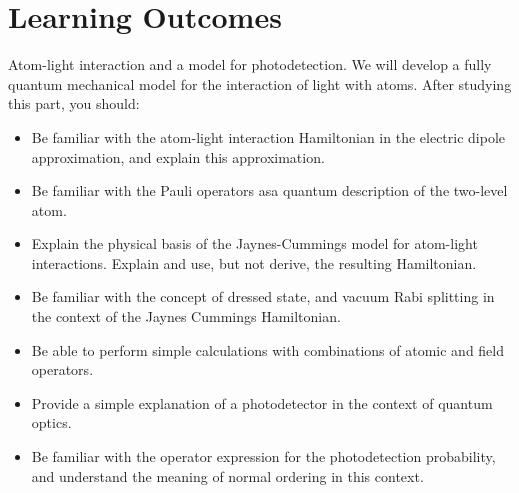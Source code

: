 \documentclass[a4paper, 11pt, normalem]{report}
\begin{document}
\section{Learning Outcomes}
Atom-light interaction and a model for photodetection.
We will develop a fully quantum mechanical model for the interaction of light with atoms. 
After studying this part, you should:
\begin{itemize}
    \item Be familiar with the atom-light interaction Hamiltonian in the electric dipole approximation, and explain this approximation.
    \item Be familiar with the Pauli operators asa quantum description of the two-level atom.
    \item Explain the physical basis of the Jaynes-Cummings model for atom-light interactions. Explain and use, but not derive, the resulting Hamiltonian.
    \item Be familiar with the concept of dressed state, and vacuum Rabi splitting in the context of the Jaynes Cummings Hamiltonian.
    \item Be able to perform simple calculations with combinations of atomic and field operators.
    \item Provide a simple explanation of a photodetector in the context of quantum optics. 
    \item Be familiar with the operator expression for the photodetection probability, and understand the meaning of normal ordering in this context.
\end{itemize}
\end{document}
